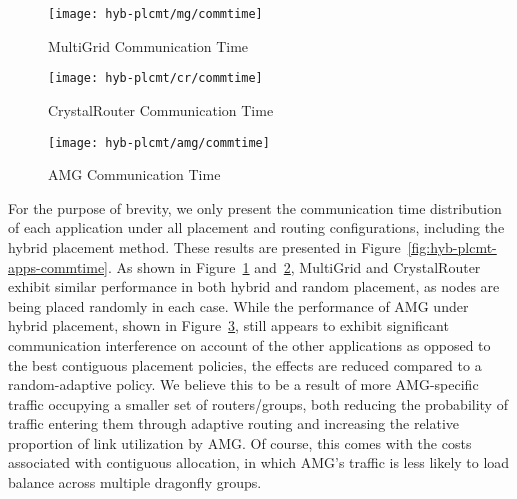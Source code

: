 
\begin{figure*}[t!]
    \centering
    \begin{subfigure}[t]{0.32\textwidth}
        \centering
        \texttt{[image: hyb-plcmt/mg/commtime]}
        \caption{MultiGrid Communication Time}
        \label{fig:hyb-plcmt-mg-commtime}
    \end{subfigure}
    \begin{subfigure}[t]{0.32\textwidth}
        \centering
        \texttt{[image: hyb-plcmt/cr/commtime]}
        \caption{CrystalRouter Communication Time}
        \label{fig:hyb-plcmt-cr-commtime}
    \end{subfigure}
    \begin{subfigure}[t]{0.32\textwidth}
        \centering
        \texttt{[image: hyb-plcmt/amg/commtime]}
        \caption{AMG Communication Time}
        \label{fig:hyb-plcmt-amg-commtime}
    \end{subfigure}
   \caption{Application communication time. Workload~ is running with all placement and routing configurations. Methods prefixed with ``hyb'' represent the hybrid allocation approach.}
   \label{fig:hyb-plcmt-apps-commtime}
\end{figure*}

For the purpose of brevity, we only present the
communication time distribution of each application under all placement and routing configurations, including the hybrid placement method. These results are presented in Figure~\ref{fig:hyb-plcmt-apps-commtime}. 
As shown in Figure~\ref{fig:hyb-plcmt-mg-commtime} and~\ref{fig:hyb-plcmt-cr-commtime},
MultiGrid and CrystalRouter exhibit similar performance in both hybrid and random placement, as nodes are being placed randomly in each case.
While the performance of AMG under hybrid placement, shown in Figure~\ref{fig:hyb-plcmt-amg-commtime}, still appears to exhibit significant communication interference on account of the other applications as opposed to the best contiguous placement policies, the effects are reduced compared to a random-adaptive policy. We believe this to be a result of more AMG-specific traffic occupying a smaller set of routers/groups, both reducing the probability of traffic entering them through adaptive routing and increasing the relative proportion of link utilization by AMG. Of course, this comes with the costs associated with contiguous allocation, in which AMG's traffic is less likely to load balance across multiple dragonfly groups.

